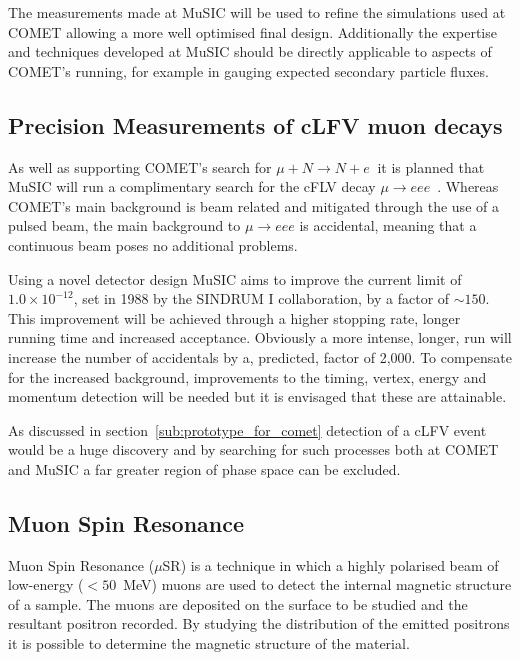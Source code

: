The measurements made at MuSIC will be used to refine the simulations used at COMET allowing a more well optimised final design. Additionally the expertise and techniques developed at MuSIC should be directly applicable to aspects of COMET's running, for example in gauging expected secondary particle fluxes.

\subsection{Precision Measurements of cLFV muon decays} %
\label{sub:precision_measurements_of_clfv_muon_decays}
As well as supporting COMET's search for \( \mu + N \rightarrow N + e\ \) it is planned that MuSIC will run a complimentary search for the cFLV decay \( \mu \rightarrow eee \)~\cite{MuSIC CDR thing}. Whereas COMET's main background is beam related and mitigated through the use of a pulsed beam, the main background to \( \mu \rightarrow eee \) is accidental, meaning that a continuous beam poses no additional problems. 

Using a novel detector design MuSIC aims to improve the current limit of \( 1.0\times10^{-12} \), set in 1988 by the SINDRUM I collaboration, by a factor of \( \sim150 \). This improvement will be achieved through a higher stopping rate, longer running time and increased acceptance. Obviously a more intense, longer, run will increase the number of accidentals by a, predicted, factor of 2,000. To compensate for the increased background, improvements to the timing, vertex, energy and momentum detection will be needed but it is envisaged that these are attainable.

As discussed in section~\ref{sub:prototype_for_comet} detection of a cLFV event would be a huge discovery and by searching for such processes both at COMET and MuSIC a far greater region of phase space can be excluded. 

\subsection{Muon Spin Resonance} %
\label{sub:muon_spin_resonance}
Muon Spin Resonance (\( \mu \)SR) is a technique in which a highly polarised beam of low-energy (\( <50 \)~MeV) muons are used to detect the internal magnetic structure of a sample. The muons are deposited on the surface to be studied and the resultant positron recorded. By studying the distribution of the emitted positrons it is possible to determine the magnetic structure of the material. 

